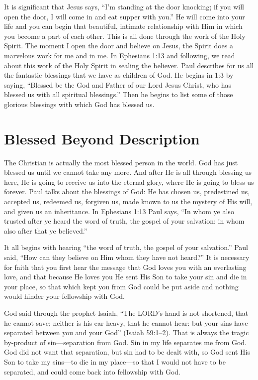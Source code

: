 It is significant that Jesus says, “I’m standing at the door 
knocking; if you will open the door, I will come in and 
eat supper with you.” He will come into your life and you 
can begin that beautiful, intimate relationship with Him in 
which you become a part of each other. This is all done 
through the work of the Holy Spirit. The moment I open the 
door and believe on Jesus, the Spirit does a marvelous work 
for me and in me. In Ephesians 1:13 and following, we read 
about this work of the Holy Spirit in sealing the believer. 
Paul describes for us all the fantastic blessings that we have 
as children of God. He begins in 1:3 by saying, “Blessed 
be the God and Father of our Lord Jesus Christ, who has 
blessed us with all spiritual blessings.” Then he begins to 
list some of those glorious blessings with which God has 
blessed us.


\section*{Blessed Beyond Description}

The Christian is actually the most blessed person in the 
world. God has just blessed us until we cannot take any 
more. And after He is all through blessing us here, He is 
going to receive us into the eternal glory, where He is going 
to bless us forever. Paul talks about the blessings of God: 
He has chosen us, predestined us, accepted us, redeemed 
us, forgiven us, made known to us the mystery of His will, 
and given us an inheritance. In Ephesians 1:13 Paul says, 
“In whom ye also trusted after ye heard the word of truth, 
the gospel of your salvation: in whom also after that ye 
believed.”

It all begins with hearing “the word of truth, the gospel 
of your salvation.” Paul said, “How can they believe on 
Him whom they have not heard?” It is necessary for faith 
that you first hear the message that God loves you with an 
everlasting love, and that because He loves you He sent His 
Son to take your sin and die in your place, so that which 
kept you from God could be put aside and nothing would 
hinder your fellowship with God.

God said through the prophet Isaiah, “The LORD’s hand 
is not shortened, that he cannot save; neither is his ear 
heavy, that he cannot hear: but your sins have separated 
between you and your God” (Isaiah 59:1–2). That is always 
the tragic by-product of sin—separation from God. Sin in 
my life separates me from God. God did not want that separation, but sin had to be dealt with, so God sent His Son to 
take my sins—to die in my place—so that I would not have 
to be separated, and could come back into fellowship with 
God.

